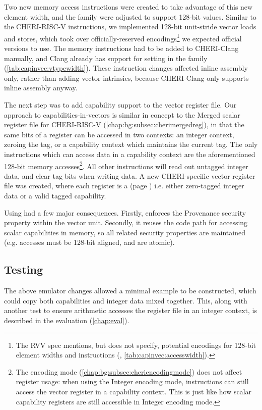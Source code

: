 \documentclass[../thesis]{subfiles}
\begin{document}
Two new memory access instructions were created to take advantage of this new element width, and the  family were adjusted to support 128-bit values.
Similar to the CHERI-RISC-V  instructions, we implemented 128-bit unit-stride vector loads and stores, which took over officially-reserved encodings\footnote{The RVV spec mentions, but does not specify, potential encodings for 128-bit element widths and instructions (\cite[p10, p32]{specification-RVV-v1.0}, \cref{tab:capinvec:accesswidth}).} we expected official versions to use.
The memory instructions had to be added to CHERI-Clang manually, and Clang already has support for setting  in the  family (\cref{tab:capinvec:vtypewidth}).
These instruction changes affected inline assembly only, rather than adding vector intrinsics, because CHERI-Clang only supports inline assembly anyway.

% 

The next step was to add capability support to the vector register file.
Our approach to capabilities-in-vectors is similar in concept to the Merged scalar register file for CHERI-RISC-V (\cref{chap:bg:subsec:cherimergedreg}), in that the same bits of a register can be accessed in two contexts: an integer context, zeroing the tag, or a capability context which maintains the current tag.
The only instructions which can access data in a capability context are the aforementioned 128-bit memory accesses\footnote{The encoding mode (\cref{chap:bg:subsec:cheriencodingmode}) does not affect register usage: when using the Integer encoding mode, instructions can still access the vector register in a capability context. This is just like how scalar capability registers are still accessible in Integer encoding mode.}.
All other instructions will read out untagged integer data, and clear tag bits when writing data.
A new CHERI-specific vector register file was created, where each register is a  (page \pageref{safetaggedcap}) i.e. either zero-tagged integer data or a valid tagged capability.

Using  had a few major consequences.
Firstly,  enforces the Provenance security property within the vector unit.
Secondly, it reuses the code path for accessing scalar capabilities in memory, so all related security properties are maintained (e.g. accesses must be 128-bit aligned, and are atomic).

\subsection{Testing}
The above emulator changes allowed a minimal  example to be constructed, which could copy both capabilities and integer data mixed together.
This, along with another test to ensure arithmetic accesses the register file in an integer context, is described in the evaluation (\cref{chap:eval}).


\end{document}
